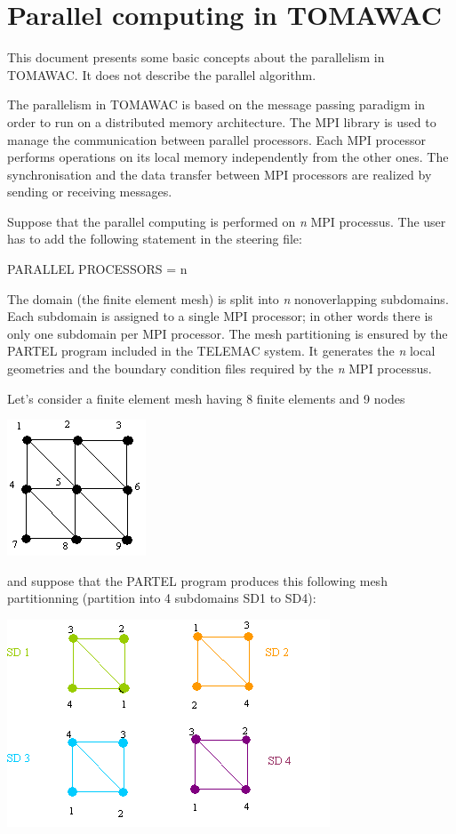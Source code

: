 
\section{ Parallel computing in TOMAWAC}



 This document presents some basic concepts about the parallelism in TOMAWAC. It does not describe the parallel algorithm.

 The parallelism in TOMAWAC is based on the message passing paradigm in order to run on a distributed memory architecture. The MPI library is used to manage the communication between parallel processors. Each MPI processor performs operations on its local memory independently from the other ones. The synchronisation and the data transfer between MPI processors are realized by sending or receiving messages.

 Suppose that the parallel computing is performed on \textit{n} MPI processus. The user has to add the following statement in the steering file:

 PARALLEL PROCESSORS = n

 The domain (the finite element mesh) is split into \textit{n} nonoverlapping subdomains. Each subdomain is assigned to a single MPI processor; in other words there is only one subdomain per MPI processor. The mesh partitioning is ensured by the PARTEL program included in the TELEMAC system. It generates the \textit{n} local geometries and the boundary condition files required by the \textit{n} MPI processus.

 Let's consider a finite element mesh having 8 finite elements and 9 nodes

\includegraphics*{graphics/partition}


 and suppose that the PARTEL program produces this following mesh partitionning (partition into 4 subdomains SD1 to SD4):

 \includegraphics*[width=3.78in]{graphics/meshpart}

